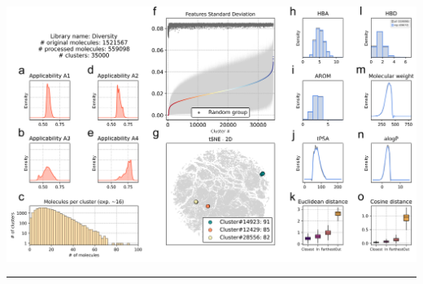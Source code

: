 
\begin{Figure_modified}
  \centering
  \includegraphics[width=1\linewidth]{figures/Navigation/Main/Diversity_random_v3.png}
  \caption{\textbf{Clustering a chemical library of compounds.}
    \textbf{a,b,d,e)} Distribution of CC signatures’ applicability values for A1, A2, A3 and A4, respectively. 
    \textbf{c)} Number of clusters (y-axis, log scale) having the specified number of molecules (x-axis). The expected number of molecules per cluster is 559k/35k \textasciitilde 16.
    \textbf{f)} For each cluster (x-axis, labeled from 0 to 34,999) standard deviations (y-axis) of the 128 features. Colored points represent the average standard deviation values of the features from signatures within the cluster, light gray bars show the range between the 20\textsuperscript{th} and 80\textsuperscript{th} percentiles of the distribution. Dark gray points represent the average standard deviation values of the features from randomly selected signatures outside the cluster.
    \textbf{g)} 2D tSNE representation of the 559k signaturized compounds (see \hyperref[Navigation_Methods]{Methods}). The top3 most populated clusters are colored accordingly, the legend indicates the number of small molecules within each of these clusters.
    \textbf{h,i,j,l,m,n)} Distributions of number of hydrogen bond acceptors, hydrogen bond donors, aromatic rings, molecular weight, topological polar surface area (tPSA) and alogP for the 559k ChemDiv compounds (after filtering, gray color) and the \textasciitilde70k selected representatives (light blue).
    \textbf{k,o)} Cosine and euclidean distances between the cluster centroid (an abstract 512-dimensional point, see \hyperref[Navigation_Methods]{Methods}) and the nearest compound, the farthest compound and the remaining compounds within each cluster, and a subset of compounds from other clusters.
}
  \vspace{-5mm}
  \rule[0ex]{\textwidth}{0.5pt}
  \vspace{-9mm}
  \label{Navigation_Fig1}
\end{Figure_modified}

